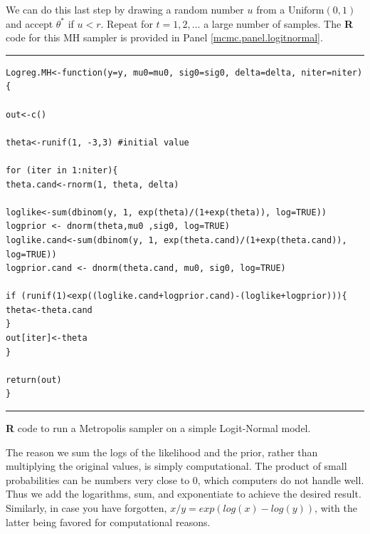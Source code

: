 We can do this last step by drawing a random number $u$ from a
$\mbox{Uniform}(0,1)$ and accept $\theta^{*}$ if
$u<r$.
Repeat for $t = 1,2,\ldots$ a large number of samples.
The {\bf R} code for this MH sampler is provided in Panel \ref{mcmc.panel.logitnormal}.

\begin{panel}[ht]
\centering
\rule[0.15in]{\textwidth}{.03in}
{\small
\begin{verbatim}
Logreg.MH<-function(y=y, mu0=mu0, sig0=sig0, delta=delta, niter=niter) {

out<-c()

theta<-runif(1, -3,3) #initial value

for (iter in 1:niter){
theta.cand<-rnorm(1, theta, delta)

loglike<-sum(dbinom(y, 1, exp(theta)/(1+exp(theta)), log=TRUE))
logprior <- dnorm(theta,mu0 ,sig0, log=TRUE)
loglike.cand<-sum(dbinom(y, 1, exp(theta.cand)/(1+exp(theta.cand)), 
log=TRUE))
logprior.cand <- dnorm(theta.cand, mu0, sig0, log=TRUE)

if (runif(1)<exp((loglike.cand+logprior.cand)-(loglike+logprior))){
theta<-theta.cand
}
out[iter]<-theta
}

return(out)
}
\end{verbatim}
}
\rule[-0.15in]{\textwidth}{.03in}
\caption{
{\bf R} code to run a Metropolis sampler on a simple Logit-Normal model.
}
\label{mcmc.panel.logitnormal}
\end{panel}



The reason we sum the logs of the likelihood and the prior, rather
than multiplying the original values, is simply computational. The
product of small probabilities can be numbers very close to 0, which
computers do not handle well. Thus we add the logarithms, sum, and
exponentiate to achieve the desired result. Similarly, in case you
have forgotten, $x/y = exp(log(x)-log(y))$, with
the latter being favored for computational reasons.

